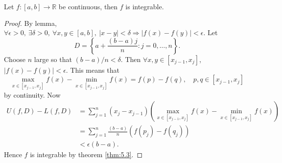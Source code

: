 \begin{theorem}\label{thm:5.6}
    Let $f:[a,b]\to \mathbb{R}$ be continuous, then $f$ is integrable. 
\end{theorem}
\begin{proof}
    By lemma, $ \forall \epsilon>0,\ \exists \delta>0,\ \forall x,y\in [a,b],\ |x-y|<\delta \Rightarrow |f(x)-f(y)|<\epsilon $. Let 
    \[
        D=\left\{ a+\frac{(b-a)j}{n}:j=0,\dots,n \right\}.
    \]
    Choose $n$ large so that $ (b-a)/n<\delta $. Then $\forall  x,y\in [x_{j-1},x_j] $, $ |f(x)-f(y)|<\epsilon $. This means that 
    \[
        \max_{x\in [x_{j-1},x_j]}f(x)-\min _{x\in [x_{j-1},x_j]}f(x)=f(p)-f(q),\quad p,q\in[x_{j-1},x_j]
    \]
    by continuity. Now 
    \begin{align*}
        U(f,D)-L(f,D)&= \sum_{j=1}^{n}(x_{j}-x_{j-1})\left( \max_{x\in [x_{j-1},x_j]}f(x)-\min _{x\in [x_{j-1},x_j]}f(x) \right)\\ 
        &= \sum_{j=1}^{n}\frac{(b-a)}{n}(f(p_j)-f(q_j))\\ 
        &<\epsilon(b-a).
    \end{align*}
    Hence $f$ is integrable by theorem \ref{thm:5.3}.
\end{proof}
